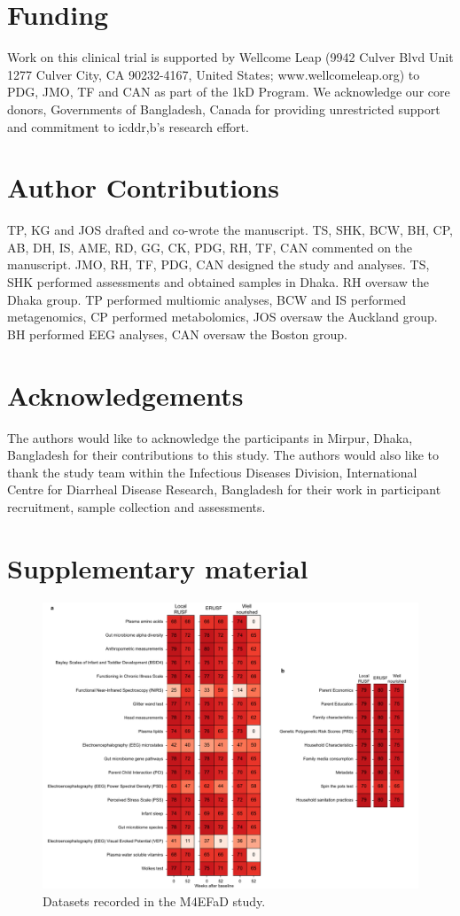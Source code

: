 \documentclass{article}
\begin{document}
\section{Funding}
Work on this clinical trial is supported by Wellcome Leap (9942 Culver Blvd Unit 1277 Culver City, CA 90232-4167, United States; www.wellcomeleap.org) to PDG, JMO, TF and CAN as part of the 1kD Program.
We acknowledge our core donors, Governments of Bangladesh, Canada for providing unrestricted support and commitment to icddr,b's research effort.

\section{Author Contributions}
TP, KG and JOS drafted and co-wrote the manuscript.
TS, SHK, BCW, BH, CP, AB, DH, IS, AME, RD, GG, CK, PDG, RH, TF, CAN commented on the manuscript.
JMO, RH, TF, PDG, CAN designed the study and analyses.
TS, SHK performed assessments and obtained samples in Dhaka.
RH oversaw the Dhaka group.
TP performed multiomic analyses, BCW and IS performed metagenomics, CP performed metabolomics, JOS oversaw the Auckland group.
BH performed EEG analyses, CAN oversaw the Boston group.

\section{Acknowledgements}
The authors would like to acknowledge the participants in Mirpur, Dhaka, Bangladesh for their contributions to this study.
The authors would also like to thank the study team within the Infectious Diseases Division, International Centre for Diarrheal Disease Research, Bangladesh for their work in participant recruitment, sample collection and assessments.



\newpage

\section{Supplementary material}
\begin{figure}[!htb]
\centering
\includegraphics[scale=0.8]{figures/newalldata.pdf}
	\caption[Datasets recoreded in the M4EFaD study]{
		Datasets recorded in the M4EFaD study.
	}
\label{Figure1}
\end{figure}
\end{document}
